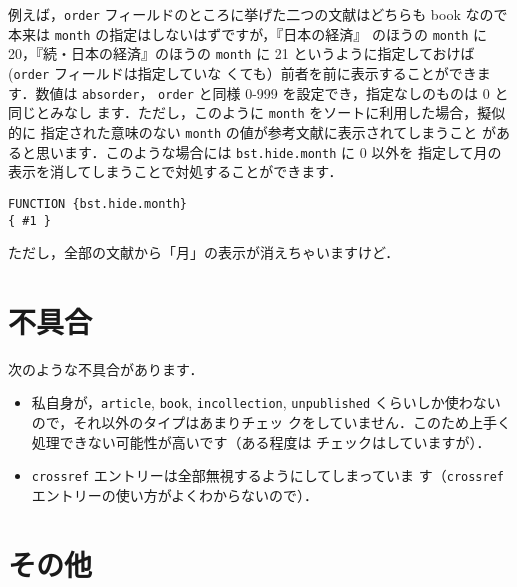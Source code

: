 \documentclass[a4j,10pt]{jarticle}
\begin{document}
例えば，\texttt{order} フィールドのところに挙げた二つの文献はどちらも 
book なので本来は \texttt{month} の指定はしないはずですが，『日本の経済』
のほうの \texttt{month} に 20，『続・日本の経済』のほうの \texttt{month} 
に 21 というように指定しておけば(\texttt{order} フィールドは指定していな
くても）前者を前に表示することができます．数値は \texttt{absorder}，
\texttt{order} と同様 0-999 を設定でき，指定なしのものは 0 と同じとみなし
ます．ただし，このように \texttt{month} をソートに利用した場合，擬似的に
指定された意味のない \texttt{month} の値が参考文献に表示されてしまうこと
があると思います．このような場合には \texttt{bst.hide.month} に 0 以外を
指定して月の表示を消してしまうことで対処することができます．
\begin{screen}
\begin{verbatim}
FUNCTION {bst.hide.month}
{ #1 }
\end{verbatim}
\end{screen}
ただし，全部の文献から「月」の表示が消えちゃいますけど．


\section{不具合}

次のような不具合があります．

\begin{itemize}
 \item 私自身が，\texttt{article}, \texttt{book}, \texttt{incollection},
       \texttt{unpublished} くらいしか使わないので，それ以外のタイプはあまりチェッ
       クをしていません．このため上手く処理できない可能性が高いです（ある程度は
       チェックはしていますが）．
 \item \texttt{crossref} エントリーは全部無視するようにしてしまっていま
       す（\texttt{crossref} エントリーの使い方がよくわからないので）．
\end{itemize}

\section{その他}
\end{document}
